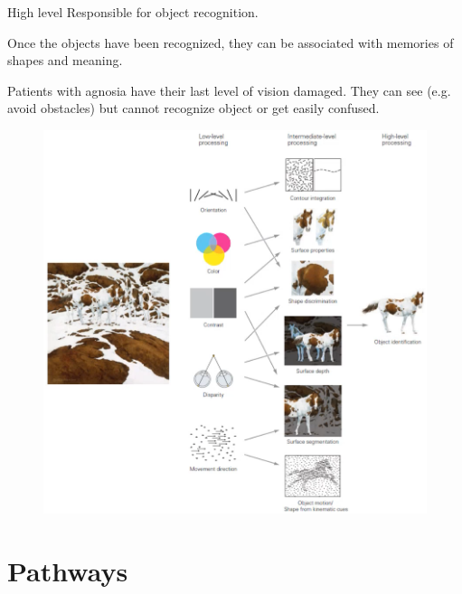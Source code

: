 \begin{description}
\begin{descriptionlist}
            \item[High level] 
                Responsible for object recognition.
                
                Once the objects have been recognized, they can be associated with memories of shapes and meaning.

                \begin{casestudy}[Agnosia]
                    Patients with agnosia have their last level of vision damaged.
                    They can see (e.g. avoid obstacles) but cannot recognize object or get easily confused.
                \end{casestudy}
        \end{descriptionlist}

        \begin{figure}[H]
            \centering
            \includegraphics[width=0.55\linewidth]{./img/vision_levels.png}
        \end{figure}
\end{description}



\section{Pathways}

